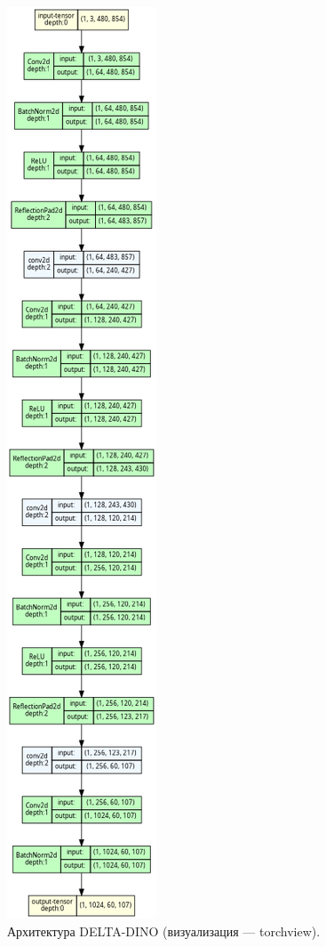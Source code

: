 \documentclass[a4paper, 14pt]{extarticle}
\theoremstyle{definition}
\theoremstyle{plain}
\theoremstyle{remark}
\begin{document}
\begin{figure}
    [H]
    \centering
    \includegraphics[height=0.95\textheight]{figs/Delta-DINO.gv.png}
    \caption{Архитектура DELTA-DINO (визуализация --- torchview).}
    \label{fig:delta-dino}
\end{figure}
\end{document}
